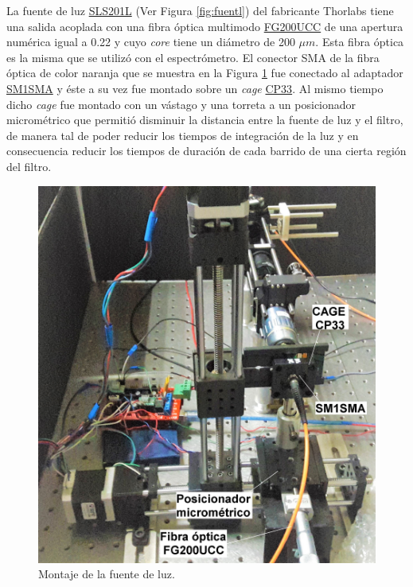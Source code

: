  La fuente de luz \href{https://www.thorlabs.com/newgrouppage9.cfm?objectgroup_id=7269&pn=SLS201L/M}{SLS201L} (Ver Figura \ref{fig:fuentl}) del fabricante Thorlabs tiene una salida acoplada con una fibra óptica multimodo \href{https://www.thorlabs.com/newgrouppage9.cfm?objectgroup_id=6839&pn=FG200UCC}{FG200UCC} de una apertura numérica igual a 0.22 y cuyo \textit{core} tiene un diámetro de 200 $\mu m$. Esta fibra óptica es la misma que se utilizó con el espectrómetro. El conector SMA de la fibra óptica de color naranja que se muestra en la Figura \ref{fig:montttluz} fue conectado al adaptador \href{https://www.thorlabs.com/thorproduct.cfm?partnumber=SM1SMA\#ad-image-0}{SM1SMA} y éste a su vez fue montado sobre un \textit{cage} \href{https://www.thorlabs.com/thorproduct.cfm?partnumber=CP33}{CP33}. Al mismo tiempo dicho \textit{cage} fue montado con un vástago y una torreta a un posicionador micrométrico que permitió disminuir la distancia entre la fuente de luz y el filtro, de manera tal de poder reducir los tiempos de integración de la luz y en consecuencia reducir los tiempos de duración de cada barrido de una cierta región del filtro.
\begin{figure}[H]
	\centering
	\includegraphics[scale=0.15]{Figs/microespectrometro/setupactualdecote_retoc_condetalles.jpg}
	\caption{Montaje de la fuente de luz.}
	\label{fig:montttluz}
\end{figure}
 
